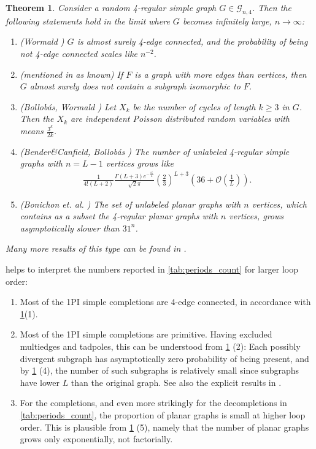 \documentclass[12pt,a4paper]{article}
\newtheorem{theorem}{Theorem}
\renewcommand{\|}{\rule[-0.4ex]{0.2ex}{1.2em}}
\begin{document}
\begin{theorem}\label{thm:random_graphs}
	Consider a random 4-regular simple graph  $G \in \mathcal{G}_{n,4}$. 
	Then the  following statements  hold in the limit where $G$ becomes infinitely large, $n\rightarrow \infty$:
\begin{enumerate}
	\item (Wormald  \cite{wormald_asymptotic_1981,bollobas_random_2001})  $G$ is almost surely 4-edge connected, and the probability of being not 4-edge connected scales like $n^{-2}$.
	\item (mentioned in \cite{wormald_models_1999} as known) If $F$ is a graph with more edges than vertices, then   $G$ almost surely does not contain a subgraph isomorphic to $F$. 
	\item (Bollobás, Wormald  \cite{bollobas_probabilistic_1980,wormald_asymptotic_1981a}) Let $X_{k}$ be the number of cycles of length $k\geq 3$ in  $G$. Then  the $X_k$ are independent Poisson distributed random variables with means $\frac{3^k}{2k}$.
	\item (Bender\&Canfield, Bollobás \cite{bender_asymptotic_1978,bollobas_probabilistic_1980,bollobas_asymptotic_1982}) The number  of  unlabeled 4-regular simple graphs with $n=L-1$ vertices  grows like
	\begin{align*}
	 \frac{1}{4! (L+2)}\frac{\Gamma(L+3) e^{-\frac{15}{4}}}{\sqrt 2 \pi }\left( \frac 2 3 \right) ^{L+3} \left( 36+ \mathcal O \left( \frac 1 L \right)   \right) . 
	\end{align*}
	\item (Bonichon et. al. \cite{bonichon_planar_2006}) The set of unlabeled planar graphs with $n$ vertices, which contains as a subset the 4-regular planar graphs with $n$ vertices, grows asymptotically slower than $31^n$.
\end{enumerate}
Many more results of this type can be found in \cite{wormald_models_1999}.
\end{theorem}


\noindent
{} helps to interpret the numbers  reported in \cref{tab:periods_count} for larger loop order:
\begin{enumerate}
	\item Most of the 1PI simple completions are 4-edge connected, in accordance with \cref{thm:random_graphs}(1).
	\item Most of the 1PI simple completions are primitive. Having excluded multiedges and tadpoles, this can be understood from \cref{thm:random_graphs} (2): Each possibly divergent subgraph has asymptotically zero probability of being present, and by \cref{thm:random_graphs} (4), the number of such subgraphs is relatively small since subgraphs have lower  $L$ than the original graph. See also the explicit results in \cite{cvitanovic_number_1978,borinsky_renormalized_2017}.
	\item For the completions, and even more strikingly for the decompletions in \cref{tab:periods_count}, the proportion of planar graphs is small at higher loop order. This is plausible  from   \cref{thm:random_graphs} (5), namely that the number of planar graphs grows only exponentially, not factorially.
\end{enumerate}
\end{document}
